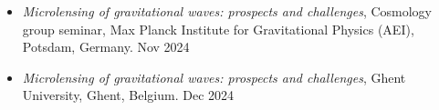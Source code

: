 \begin{itemize}
    \item \textit{Microlensing of gravitational waves: prospects and challenges}, Cosmology group seminar, Max Planck Institute for Gravitational Physics (AEI), Potsdam, Germany. \hfill{Nov 2024}

    \item \textit{Microlensing of gravitational waves: prospects and challenges}, Ghent University, Ghent, Belgium. \hfill{Dec 2024}
\end{itemize}